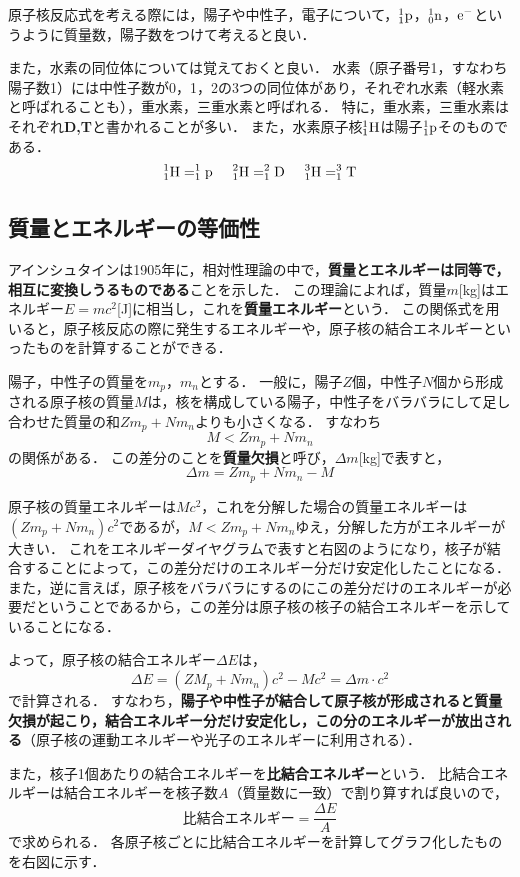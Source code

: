 原子核反応式を考える際には，陽子や中性子，電子について，${\rm ^1_1 p}$，${\rm ^1_0 n}$，${\rm e^-}$というように質量数，陽子数をつけて考えると良い．

また，水素の同位体については覚えておくと良い．
水素（原子番号1，すなわち陽子数1）には中性子数が0，1，2の3つの同位体があり，それぞれ水素（軽水素と呼ばれることも），重水素，三重水素と呼ばれる．
特に，重水素，三重水素はそれぞれ{\bf D,T}と書かれることが多い．
また，水素原子核${\rm ^1_1H}$は陽子${\rm ^1_1p}$そのものである．
$${\rm ^1_1H=^1_1p \hspace{5mm} ^2_1H=^2_1D \hspace{5mm} ^3_1H=^3_1T}$$

\subsection{質量とエネルギーの等価性}

アインシュタインは1905年に，相対性理論の中で，{\bf 質量とエネルギーは同等で，相互に変換しうるものである}ことを示した．
この理論によれば，質量$m$[kg]はエネルギー$E=mc^2$[J]に相当し，これを{\bf 質量エネルギー}という．
この関係式を用いると，原子核反応の際に発生するエネルギーや，原子核の結合エネルギーといったものを計算することができる．

陽子，中性子の質量を$m_p$，$m_n$とする．
一般に，陽子$Z$個，中性子$N$個から形成される原子核の質量$M$は，核を構成している陽子，中性子をバラバラにして足し合わせた質量の和$Zm_p+Nm_n$よりも小さくなる．
すなわち
$$M<Zm_p+Nm_n$$
の関係がある．
この差分のことを{\bf 質量欠損}と呼び，$\Delta m$[kg]で表すと，
$$\Delta m=Zm_p+Nm_n-M$$

原子核の質量エネルギーは$Mc^2$，これを分解した場合の質量エネルギーは$(Zm_p+Nm_n)c^2$であるが，$M<Zm_p+Nm_n$ゆえ，分解した方がエネルギーが大きい．
これをエネルギーダイヤグラムで表すと右図のようになり，核子が結合することによって，この差分だけのエネルギー分だけ安定化したことになる．
また，逆に言えば，原子核をバラバラにするのにこの差分だけのエネルギーが必要だということであるから，この差分は原子核の核子の結合エネルギーを示していることになる．

よって，原子核の結合エネルギー$\Delta E$は，
$$\Delta E=(ZM_p+Nm_n)c^2-Mc^2=\Delta m \cdot c^2$$
で計算される．
すなわち，{\bf 陽子や中性子が結合して原子核が形成されると質量欠損が起こり，結合エネルギー分だけ安定化し，この分のエネルギーが放出される}（原子核の運動エネルギーや光子のエネルギーに利用される）．

また，核子1個あたりの結合エネルギーを{\bf 比結合エネルギー}という．
比結合エネルギーは結合エネルギーを核子数$A$（質量数に一致）で割り算すれば良いので，
$$比結合エネルギー=\dfrac{\Delta E}{A}$$
で求められる．
各原子核ごとに比結合エネルギーを計算してグラフ化したものを右図に示す．

